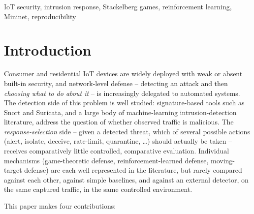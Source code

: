 \documentclass[conference]{IEEEtran}
\newcommand{\ci}[2]{[#1, #2]}
\begin{document}
\begin{abstract}
\ci{97.8}{99.9}, with $16$ of $17$ conditions scoring a clean $100\%$. One further attempted fix
-- quadrupling PPO's training budget to eliminate a residual seed-dependent failure -- was tried,
measured on a full ten-seed sweep, found not to generalize from the single seed it was validated
on, and reverted; we report this as a documented dead end, not a success. We conclude that the
three response-selection policies are behaviorally indistinguishable on in-distribution traffic
(McNemar's exact test, $p=1.0$) but diverge significantly near decision boundaries
($p<1.2\times10^{-159}$), that our system now materially outperforms naive baselines by a wide,
formally-tested margin, and that every result in this paper is scoped to a single controlled VM
and Mininet topology -- external validity remains an explicitly open problem, and internal
validity was earned through disclosed, repeated self-correction rather than assumed.
\end{abstract}

\begin{IEEEkeywords}
IoT security, intrusion response, Stackelberg games, reinforcement learning, Mininet, reproducibility
\end{IEEEkeywords}

\section{Introduction}

Consumer and residential IoT devices are widely deployed with weak or absent built-in security,
and network-level defense -- detecting an attack and then \emph{choosing what to do about it} --
is increasingly delegated to automated systems. The detection side of this problem is well
studied: signature-based tools such as Snort and Suricata, and a large body of machine-learning
intrusion-detection literature, address the question of whether observed traffic is malicious.
The \emph{response-selection} side -- given a detected threat, which of several possible actions
(alert, isolate, deceive, rate-limit, quarantine, \ldots) should actually be taken -- receives
comparatively little controlled, comparative evaluation. Individual mechanisms (game-theoretic
defense, reinforcement-learned defense, moving-target defense) are each well represented in the
literature, but rarely compared against each other, against simple baselines, and against an
external detector, on the same captured traffic, in the same controlled environment.

This paper makes four contributions:
\end{document}
